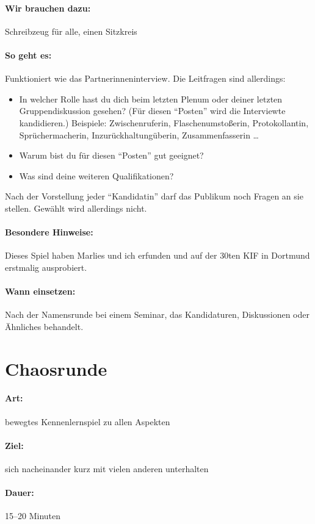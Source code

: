 \paragraph{Wir brauchen dazu:} Schreibzeug für alle, einen Sitzkreis
\paragraph{So geht es:} Funktioniert wie das Partnerinneninterview. Die Leitfragen sind allerdings:
  \begin{itemize}
    \item In welcher Rolle hast du dich beim letzten Plenum oder deiner letzten Gruppendiskussion gesehen? (Für diesen "`Posten"' wird die Interviewte kandidieren.) Beispiele: Zwischenruferin, Flaschenumstoßerin, Protokollantin, Sprüchermacherin, Inzurückhaltungüberin, Zusammenfasserin \ldots
    \item Warum bist du für diesen "`Posten"' gut geeignet?
    \item Was sind deine weiteren Qualifikationen?
  \end{itemize}

Nach der Vorstellung jeder "`Kandidatin"' darf das Publikum noch Fragen an sie stellen. Gewählt wird allerdings nicht.
\paragraph{Besondere Hinweise:} Dieses Spiel haben Marlies und ich erfunden und auf der 30ten KIF in Dortmund erstmalig ausprobiert.
\paragraph{Wann einsetzen:} Nach der Namensrunde bei einem Seminar, das Kandidaturen, Diskussionen oder Ähnliches behandelt.

\section{Chaosrunde}
\paragraph{Art:} bewegtes Kennenlernspiel zu allen Aspekten
\paragraph{Ziel:} sich nacheinander kurz mit vielen anderen unterhalten
\paragraph{Dauer:} 15--20 Minuten
